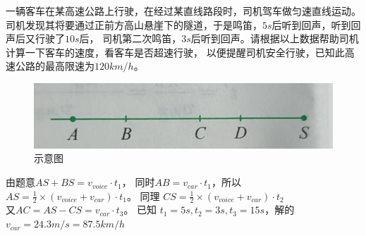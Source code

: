 \documentclass[windows,csize4]{BHCexam}
\begin{document}
\begin{groups}
\begin{questions}[]
        \question[5] 一辆客车在某高速公路上行驶，在经过某直线路段时，司机驾车做匀速直线运动。
        司机发现其将要通过正前方高山悬崖下的隧道，于是鸣笛，$5s$后听到回声，听到回声后又行驶了$10s$后，
        司机第二次鸣笛，$3s$后听到回声。请根据以上数据帮助司机计算一下客车的速度，看客车是否超速行驶，
        以便提醒司机安全行驶，已知此高速公路的最高限速为$120km/h$。
        \begin{figure}[htb]
            \centering
            \includegraphics [scale=0.3,trim=0 0 0 0]{./image/fig_2_6.jpg}
            \caption{示意图}
            \label{fig:fig_2_6}
        \end{figure}
        \begin{solution}{0.5cm}
            \methodonly
            由题意$AS+BS=v_{voice}\cdot t_{1}$，
            同时$AB=v_{car}\cdot t_1$，所以$AS=\frac{1}{2}\times (v_{voice}+v_{car})\cdot t_1$。
            同理 $CS=\frac{1}{2}\times (v_{voice}+v_{car})\cdot t_2$ \\
            又$AC=AS-CS=v_{car}\cdot t_3$。
            已知 $t_1=5s,t_2=3s, t_3=15s$，解的$v_{car}=24.3m/s=87.5km/h$
        \end{solution}

        \vspace{3.5cm}


\end{questions}
\end{groups}
\end{document}
